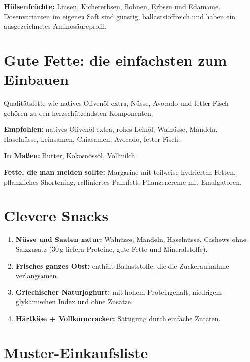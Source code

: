 \documentclass[a5paper,12pt,oneside,openany]{book}
\begin{document}
\textbf{H\"{u}lsenfr\"{u}chte:} Linsen, Kichererbsen, Bohnen, Erbsen und
Edamame. Dosenvarianten im eigenen Saft sind g\"{u}nstig, ballaststoffreich
und haben ein ausgezeichnetes Aminos\"{a}ureprofil.

\section{Gute Fette: die einfachsten zum Einbauen}

Qualit\"{a}tsfette wie natives Oliven\"{o}l extra, N\"{u}sse, Avocado und
fetter Fisch geh\"{o}ren zu den herzsch\"{u}tzendsten Komponenten.

\textbf{Empfohlen:} natives Oliven\"{o}l extra, rohes Lein\"{o}l, Waln\"{u}sse,
Mandeln, Haseln\"{u}sse, Leinsamen, Chiasamen, Avocado, fetter Fisch.

\textbf{In Ma{\ss}en:} Butter, Kokosn\"{o}ss\"{o}l, Vollmilch.

\textbf{Fette, die man meiden sollte:} Margarine mit teilweise hydrierten
Fetten, pflanzliches Shortening, raffiniertes Palmfett, Pflanzencreme mit
Emulgatoren.

\section{Clevere Snacks}

\begin{enumerate}
  \item \textbf{N\"{u}sse und Saaten natur:} Waln\"{u}sse, Mandeln, Haseln\"{u}sse,
    Cashews ohne Salzzusatz (30\,g liefern Proteine, gute Fette und Mineralstoffe).
  \item \textbf{Frisches ganzes Obst:} enth\"{a}lt Ballaststoffe, die die
    Zuckeraufnahme verlangsamen.
  \item \textbf{Griechischer Naturjoghurt:} mit hohem Proteingehalt, niedrigem
    glyk\"{a}mischen Index und ohne Zus\"{a}tze.
  \item \textbf{H\"{a}rtk\"{a}se + Vollkorncracker:} S\"{a}ttigung durch
    einfache Zutaten.
\end{enumerate}

\section{Muster-Einkaufsliste}
\end{document}
